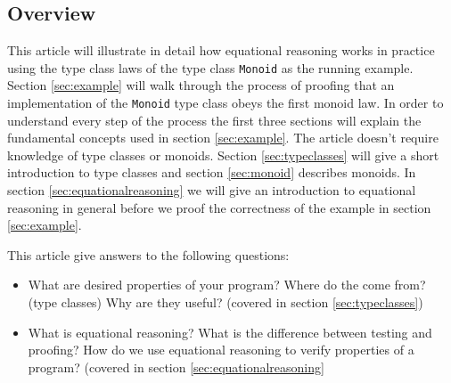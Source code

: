 \subsection{Overview}

This article will illustrate in detail how equational reasoning works in practice using the type class laws of the type class \verb|Monoid| as the running example. Section \ref{sec:example} will walk through the process of proofing that an implementation of the \verb|Monoid| type class obeys the first monoid law.  In order to understand every step of the process the first three sections will explain the fundamental concepts used in section \ref{sec:example}. The article doesn't require knowledge of type classes or \glspl{monoid}. 
Section \ref{sec:typeclasses} will give a short introduction to type classes and section \ref{sec:monoid} describes monoids. In section \ref{sec:equationalreasoning} we will give an introduction to equational reasoning in general before we proof the correctness of the example in section \ref{sec:example}.

This article give answers to the following questions:
\begin{itemize}
\item What are desired properties of your program? Where do the come from? (type classes) Why are they useful? (covered in section \ref{sec:typeclasses})
\item What is equational reasoning? What is the difference between testing and proofing? How do we use equational reasoning to verify properties of a program? (covered in section \ref{sec:equationalreasoning}
\end{itemize}

